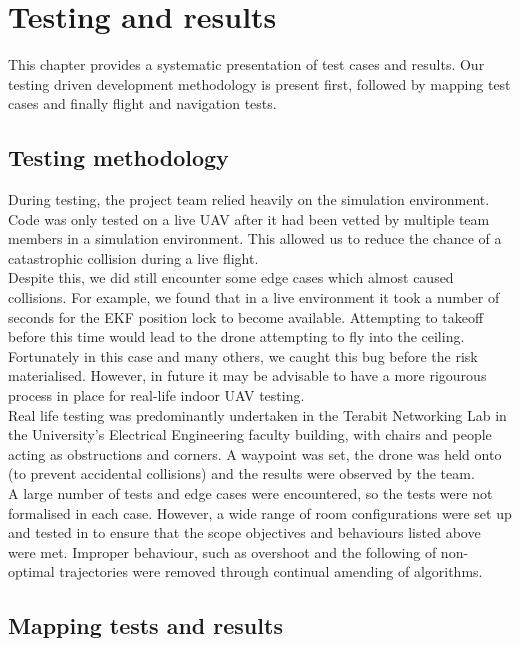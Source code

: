 \documentclass[capstone_report.tex]{subfiles}
\begin{document}
\chapter{Testing and results}
This chapter provides a systematic presentation of test cases and results. Our testing driven development methodology is present first, followed by mapping test cases and finally flight and navigation tests. 

\section{Testing methodology}
During testing, the project team relied heavily on the simulation environment. Code was only tested on a live UAV after it had been vetted by multiple team members in a simulation environment. This allowed us to reduce the chance of a catastrophic collision during a live flight.\\

Despite this, we did still encounter some edge cases which almost caused collisions. For example, we found that in a live environment it took a number of seconds for the EKF position lock to become available. Attempting to takeoff before this time would lead to the drone attempting to fly into the ceiling. Fortunately in this case and many others, we caught this bug before the risk materialised. However, in future it may be advisable to have a more rigourous process in place for real-life indoor UAV testing.\\

Real life testing was predominantly undertaken in the Terabit Networking Lab in the University’s Electrical Engineering faculty building, with chairs and people acting as obstructions and corners. A waypoint was set, the drone was held onto (to prevent accidental collisions) and the results were observed by the team.\\

A large number of tests and edge cases were encountered, so the tests were not formalised in each case. However, a wide range of room configurations were set up and tested in to ensure that the scope objectives and behaviours listed above were met. Improper behaviour, such as overshoot and the following of non-optimal trajectories were removed through continual amending of algorithms.

\section{Mapping tests and results}
\end{document}
